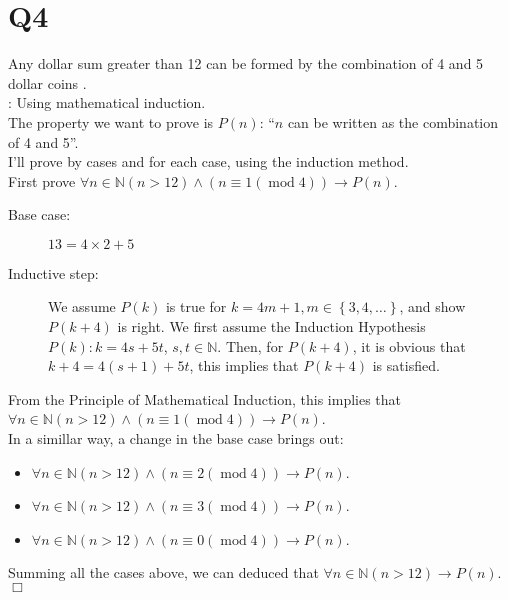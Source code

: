 \documentclass[11pt]{article}
\def\endproofmark{$\Box$}
\newenvironment{proof}{{\bf Proof}:}{\endproofmark\smallskip}
\begin{document}
\section*{Q4}
Any dollar sum greater than 12 can be formed by the
combination of 4 and 5 dollar coins .
\\
\begin{proof}
    Using mathematical induction.
\\
    The property we want to prove is $P(n)$: 
    ``$n$ can be written as the combination of 4 and 5''.
    \\
    I'll prove by cases and for each case, using the induction method.
\\
    First prove $\forall n\in \mathbb{N} (n>12) 
    \land (n\equiv 1(\operatorname{mod} 4))\to P(n)$.
    \begin{description}
        \item [Base case:] $13=4\times 2+5$
        \item [Inductive step:] We assume $P(k)$ is true for 
        $k=4m+1,m \in \left\{ 3,4, \ldots  \right\}$, and
        show $P(k+4)$ is right.
        We first assume the Induction Hypothesis $P(k):k=4s+5t$,
        $s,t \in \mathbb{N}$. Then, for $P(k+4)$, it is obvious that
        $k+4=4(s+1)+5t$, this implies that $P(k+4)$ is satisfied.
    \end{description}
    From the Principle of Mathematical Induction, 
    this implies that $\forall n\in \mathbb{N} (n>12) 
    \land (n\equiv 1(\operatorname{mod} 4))\to P(n)$.
    \\
    In a simillar way, a change in the base case brings out:
    \begin{itemize}
        
        \item $\forall n\in \mathbb{N} (n>12) 
        \land (n\equiv 2(\operatorname{mod} 4))\to P(n)$.
        
        \item $\forall n\in \mathbb{N} (n>12) 
        \land (n\equiv 3(\operatorname{mod} 4))\to P(n)$.
        
        \item $\forall n\in \mathbb{N} (n>12) 
        \land (n\equiv 0(\operatorname{mod} 4))\to P(n)$.
    \end{itemize}
    Summing all the cases above, 
    we can deduced that 
    $\forall n \in \mathbb{N}(n>12)\to P(n)$.
\end{proof}
\end{document}
